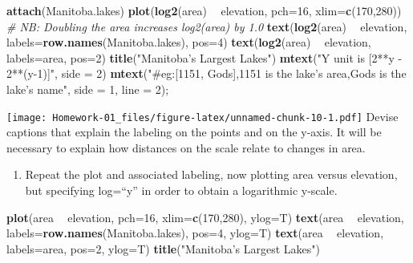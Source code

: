\documentclass[
]{article}
\newenvironment{Shaded}{\begin{snugshade}}{\end{snugshade}}
\newcommand{\CommentTok}[1]{\textcolor[rgb]{0.56,0.35,0.01}{\textit{#1}}}
\newcommand{\DataTypeTok}[1]{\textcolor[rgb]{0.13,0.29,0.53}{#1}}
\newcommand{\DecValTok}[1]{\textcolor[rgb]{0.00,0.00,0.81}{#1}}
\newcommand{\KeywordTok}[1]{\textcolor[rgb]{0.13,0.29,0.53}{\textbf{#1}}}
\newcommand{\NormalTok}[1]{#1}
\newcommand{\OperatorTok}[1]{\textcolor[rgb]{0.81,0.36,0.00}{\textbf{#1}}}
\newcommand{\StringTok}[1]{\textcolor[rgb]{0.31,0.60,0.02}{#1}}
\providecommand{\tightlist}{%
  \setlength{\itemsep}{0pt}\setlength{\parskip}{0pt}}
\begin{document}
\begin{Shaded}
\begin{Highlighting}[]
\KeywordTok{attach}\NormalTok{(Manitoba.lakes)}
\KeywordTok{plot}\NormalTok{(}\KeywordTok{log2}\NormalTok{(area) }\OperatorTok{~}\StringTok{ }\NormalTok{elevation, }\DataTypeTok{pch=}\DecValTok{16}\NormalTok{, }\DataTypeTok{xlim=}\KeywordTok{c}\NormalTok{(}\DecValTok{170}\NormalTok{,}\DecValTok{280}\NormalTok{))}
\CommentTok{# NB: Doubling the area increases log2(area) by 1.0}
\KeywordTok{text}\NormalTok{(}\KeywordTok{log2}\NormalTok{(area) }\OperatorTok{~}\StringTok{ }\NormalTok{elevation, }\DataTypeTok{labels=}\KeywordTok{row.names}\NormalTok{(Manitoba.lakes), }\DataTypeTok{pos=}\DecValTok{4}\NormalTok{)}
\KeywordTok{text}\NormalTok{(}\KeywordTok{log2}\NormalTok{(area) }\OperatorTok{~}\StringTok{ }\NormalTok{elevation, }\DataTypeTok{labels=}\NormalTok{area, }\DataTypeTok{pos=}\DecValTok{2}\NormalTok{) }
\KeywordTok{title}\NormalTok{(}\StringTok{"Manitoba’s Largest Lakes"}\NormalTok{)}
\KeywordTok{mtext}\NormalTok{(}\StringTok{"Y unit is [2**y - 2**(y-1)]"}\NormalTok{, }\DataTypeTok{side =} \DecValTok{2}\NormalTok{)}
\KeywordTok{mtext}\NormalTok{(}\StringTok{"#eg:[1151, Gods],1151 is the lake's area,Gods is the lake's name"}\NormalTok{, }\DataTypeTok{side =} \DecValTok{1}\NormalTok{, }\DataTypeTok{line =} \DecValTok{2}\NormalTok{);}
\end{Highlighting}
\end{Shaded}

\texttt{[image: Homework-01\_files/figure-latex/unnamed-chunk-10-1.pdf]}
Devise captions that explain the labeling on the points and on the
y-axis. It will be necessary to explain how distances on the scale
relate to changes in area.

\begin{enumerate}
\def\labelenumi{(\alph{enumi})}
\setcounter{enumi}{1}
\tightlist
\item
  Repeat the plot and associated labeling, now plotting area versus
  elevation, but specifying log=``y'' in order to obtain a logarithmic
  y-scale.
\end{enumerate}

\begin{Shaded}
\begin{Highlighting}[]
\KeywordTok{plot}\NormalTok{(area }\OperatorTok{~}\StringTok{ }\NormalTok{elevation, }\DataTypeTok{pch=}\DecValTok{16}\NormalTok{, }\DataTypeTok{xlim=}\KeywordTok{c}\NormalTok{(}\DecValTok{170}\NormalTok{,}\DecValTok{280}\NormalTok{), }\DataTypeTok{ylog=}\NormalTok{T)}
\KeywordTok{text}\NormalTok{(area }\OperatorTok{~}\StringTok{ }\NormalTok{elevation, }\DataTypeTok{labels=}\KeywordTok{row.names}\NormalTok{(Manitoba.lakes), }\DataTypeTok{pos=}\DecValTok{4}\NormalTok{, }\DataTypeTok{ylog=}\NormalTok{T)}
\KeywordTok{text}\NormalTok{(area }\OperatorTok{~}\StringTok{ }\NormalTok{elevation, }\DataTypeTok{labels=}\NormalTok{area, }\DataTypeTok{pos=}\DecValTok{2}\NormalTok{, }\DataTypeTok{ylog=}\NormalTok{T) }
\KeywordTok{title}\NormalTok{(}\StringTok{"Manitoba’s Largest Lakes"}\NormalTok{)}
\end{Highlighting}
\end{Shaded}
\end{document}
